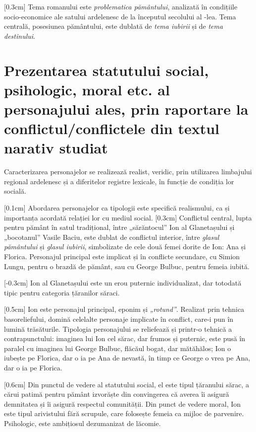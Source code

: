 [0.3cm]
Tema romanului este \textit{problematica pământului}, analizată în condițiile so\-ci\-o-e\-co\-no\-mi\-ce ale satului ardelenesc de la începutul secolului al -lea. Tema centrală, posesiunea pământului, este dublată de \textit{tema iubirii} și de \textit{tema destinului}.


\section{Prezentarea statutului social, psihologic, moral etc. al personajului ales, prin raportare la conflictul/conflictele din textul narativ studiat}

Caracterizarea personajelor se realizează realist, veridic, prin utilizarea limbajului regional ardelenesc și a diferitelor registre lexicale, în funcție de condiția lor socială.

[0.1cm]
Abordarea personajelor ca tipologii este specifică realismului, ca și importanța acordată relației lor cu mediul social.
[0.3cm]
Conflictul central, lupta pentru pământ în satul tradițional, între „sărăntocul” Ion al Glanetașului și „bocotanul” Vasile Baciu, este dublat de conflictul interior, între \textit{glasul pământului} și \textit{glasul iubirii}, simbolizate de cele două femei dorite de Ion: Ana și Florica. Personajul principal este implicat și în conflicte secundare, cu Simion Lungu, pentru o brazdă de pământ, sau cu George Bulbuc, pentru femeia iubită.

[-0.3cm]
Ion al Glanetașului este un erou puternic individualizat, dar totodată tipic pentru categoria țăranilor săraci.

[0.5cm]
Ion este personajul principal, eponim și \textit{„rotund”}. Realizat prin tehnica basoreliefului, domină celelalte personaje implicate în conflict, care-i pun în lumină trăsăturile. Tipologia personajului se reliefează și printr-o tehnică a contrapunctului: imaginea lui Ion cel sărac, dar frumos și puternic, este pusă în paralel cu imaginea lui George Bulbuc, flăcăul bogat, dar mătăhălos; Ion o iubește pe Florica, dar o ia pe Ana de nevastă, în timp ce George o vrea pe Ana, dar o ia pe Florica.

[0.6cm]
Din punctul de vedere al statutului social, el este tipul țăranului sărac, a cărui patimă pentru pământ izvorăște din convingerea  că averea îi asigură demnitatea și îi asigură respectul comunității. Din punct de vedere moral, Ion este tipul arivistului fără scrupule, care folosește femeia ca mijloc de parvenire. Psihologic, este ambițiosul dezumanizat de lăcomie.



